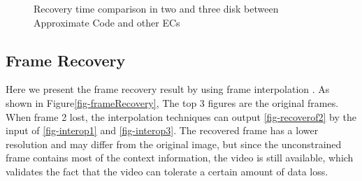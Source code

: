 \documentclass[sigconf]{acmart}
\begin{document}
\begin{figure}[ht]
    \vspace{-0.3cm}
    \caption{Recovery time comparison in two and three disk between Approximate Code and other ECs}\label{fig-recovery}
    \end{figure}

\subsection{Frame Recovery}
Here we present the frame recovery result by using frame interpolation \cite{meyer2015phase, niklaus2018context,van2017frame}. As shown in Figure\ref{fig-frameRecovery}, The top 3 figures are the original frames. When frame 2 lost, the interpolation techniques can output \ref{fig-recoverof2} by the input of \ref{fig-interop1} and \ref{fig-interop3}. The recovered frame has a lower resolution and may differ from the original image, but since the unconstrained frame contains most of the context information, the video is still available, which validates the fact that the video can tolerate a certain amount of data loss.
\end{document}
